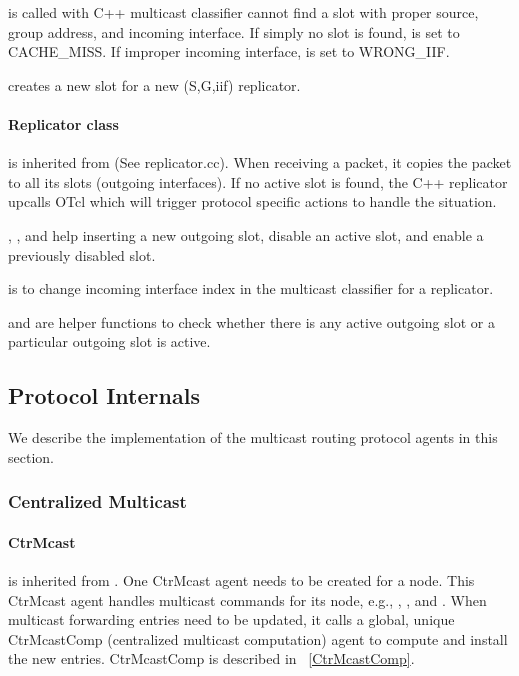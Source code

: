  is called with C++ multicast classifier cannot find a
slot with proper source, group address, and incoming interface.  If simply
no slot is found,  is set to CACHE_MISS.  If improper incoming
interface,  is set to WRONG_IIF.

 creates a new slot for a new (S,G,iif) replicator.


\paragraph{Replicator class}
 is inherited from
 (See replicator.cc).  When receiving a
packet, it copies the packet to all its slots (outgoing interfaces). If no
active slot is found, the C++ replicator upcalls OTcl  which
will trigger protocol specific actions to handle the situation.

, , and  help inserting a new
outgoing slot, disable an active slot, and enable a previously disabled
slot.

 is to change incoming interface index in the multicast
classifier for a replicator.

 and  are helper functions to check whether
there is any active outgoing slot or a particular outgoing slot is active. 

\subsection{Protocol Internals}
\label{sec:mcastproto-internals}

We describe the implementation of the multicast routing protocol agents in
this section.

\subsubsection{Centralized Multicast}

\paragraph{CtrMcast}
\label{CtrMcast}
 is inherited from .  One CtrMcast
agent needs to be created for a node.  This CtrMcast agent handles multicast
commands for its node, e.g., , 
, and .
When multicast forwarding entries need to be updated, it calls a 
global, unique CtrMcastComp
(centralized multicast computation) agent to compute and install the new
entries.  CtrMcastComp is described in ~\ref{CtrMcastComp}.

